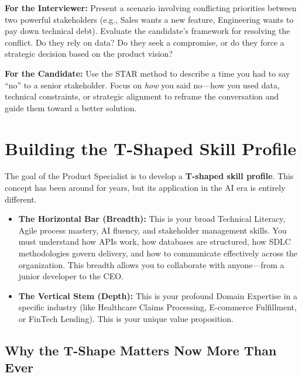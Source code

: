 \documentclass[
  11pt,
  openany,
  oneside]{book}
\providecommand{\tightlist}{%
  \setlength{\itemsep}{0pt}\setlength{\parskip}{0pt}}
\renewenvironment{quote}{\begin{customquote}}{\end{customquote}}
\begin{document}
\begin{quote}
\textbf{For the Interviewer:} Present a scenario involving conflicting
priorities between two powerful stakeholders (e.g., Sales wants a new
feature, Engineering wants to pay down technical debt). Evaluate the
candidate's framework for resolving the conflict. Do they rely on data?
Do they seek a compromise, or do they force a strategic decision based
on the product vision?
\end{quote}

\begin{quote}
\textbf{For the Candidate:} Use the STAR method to describe a time you
had to say ``no'' to a senior stakeholder. Focus on \emph{how} you said
no---how you used data, technical constraints, or strategic alignment to
reframe the conversation and guide them toward a better solution.
\end{quote}

\bigskip

\section{Building the T-Shaped Skill
Profile}\label{building-the-t-shaped-skill-profile}

The goal of the Product Specialist is to develop a \textbf{T-shaped
skill profile}. This concept has been around for years, but its
application in the AI era is entirely different.

\begin{itemize}
\tightlist
\item
  \textbf{The Horizontal Bar (Breadth):} This is your broad Technical
  Literacy, Agile process mastery, AI fluency, and stakeholder
  management skills. You must understand how APIs work, how databases
  are structured, how SDLC methodologies govern delivery, and how to
  communicate effectively across the organization. This breadth allows
  you to collaborate with anyone---from a junior developer to the CEO.
\item
  \textbf{The Vertical Stem (Depth):} This is your profound Domain
  Expertise in a specific industry (like Healthcare Claims Processing,
  E-commerce Fulfillment, or FinTech Lending). This is your unique value
  proposition.
\end{itemize}

\subsection{Why the T-Shape Matters Now More Than
Ever}\label{why-the-t-shape-matters-now-more-than-ever}
\end{document}
